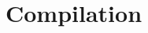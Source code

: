 \documentclass{sig-alternate-10pt}
\newcommand{\sysname}{{\small \sf Methane}\xspace}
\newcommand{\CD}[1]{\texttt{\small #1}}  %
\newcommand{\KW}[1]{\texttt{\small\bfseries{#1}}}
\newcommand{\True}{\CD{true}}
\newcommand{\Define}{\KW{define}}
\newcommand{\Path}{\texttt{=>}}
\newcommand{\Link}{\texttt{->}}
\newcommand{\Agg}{\KW{agg}}
\newcommand{\In}{\KW{in}}
\newcommand{\Out}{\KW{out}}
\newcommand{\AND}{\texttt{\&}}
\newcommand{\OR}{\texttt{|}}
\newcommand{\End}{\KW{end}}
\begin{document}

%
%
%
%

\section{Compilation}
\label{sec:compilation}
\end{document}

